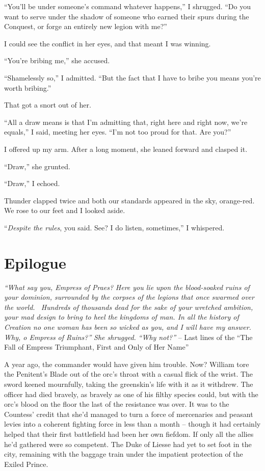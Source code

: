 \documentclass[12pt, openany]{book}
\begin{document}
“You’ll be under someone’s command whatever happens,” I shrugged. “Do you want to serve under the shadow of someone who earned their spurs during the Conquest, or forge an entirely new legion with me?”

I could see the conflict in her eyes, and that meant I was winning.

“You’re bribing me,” she accused.

“Shamelessly so,” I admitted. “But the fact that I have to bribe you means you’re worth bribing.”

That got a snort out of her.

“All a draw means is that I’m admitting that, right here and right now, we’re equals,” I said, meeting her eyes. “I’m not too proud for that. Are you?”

I offered up my arm. After a long moment, she leaned forward and clasped it.

“Draw,” she grunted.

“Draw,” I echoed.

Thunder clapped twice and both our standards appeared in the sky, orange-red. We rose to our feet and I looked aside.

“\textit{Despite the rules}, you said. See? I do listen, sometimes,” I whispered.
\clearpage
\chapter{Epilogue}

\textit{“What say you, Empress of Praes? }
\textit{Here you lie upon the blood-soaked ruins of your dominion, surrounded by the corpses of the legions that once swarmed over the world.  Hundreds of thousands dead for the sake of your wretched ambition, your mad design to bring to heel the kingdoms of man. In all the history of Creation no one woman has been so wicked as you, and I will have my answer. }
\textit{Why, o Empress of Ruins?”}
\textit{She shrugged.}
\textit{“Why not?”
}– Last lines of the “The Fall of Empress Triumphant, First and Only of Her Name”



A year ago, the commander would have given him trouble. Now? William tore the Penitent’s Blade out of the orc’s throat with a casual flick of the wrist. The sword keened mournfully, taking the greenskin’s life with it as it withdrew. The officer had died bravely, as bravely as one of his filthy species could, but with the orc’s blood on the floor the last of the resistance was over. It was to the Countess’ credit that she’d managed to turn a force of mercenaries and peasant levies into a coherent fighting force in less than a month – though it had certainly helped that their first battlefield had been her own fiefdom. If only all the allies he’d gathered were so competent. The Duke of Liesse had yet to set foot in the city, remaining with the baggage train under the impatient protection of the Exiled Prince.
\end{document}
